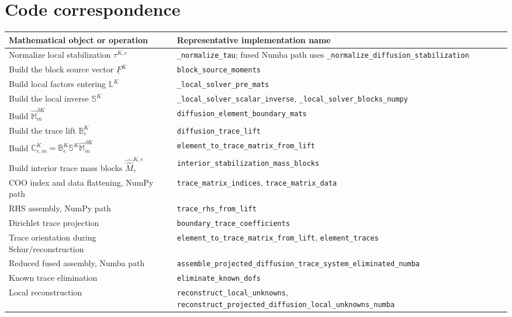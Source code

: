 \documentclass[11pt]{article}
\newcommand{\FK}{\underline F^K}
\newcommand{\LK}{\mathbb L^K}
\newcommand{\SK}{\mathbb S^K}
\newcommand{\B}{\mathbb B}
\newcommand{\C}{\mathbb C}
\newcommand{\Mbb}{\widehat{\mathbb M}}
\newcommand{\Mhh}{\widehat{\widehat M}}
\newcommand{\code}[1]{\texttt{#1}}
\begin{document}
\section{Code correspondence}

\begin{center}
\renewcommand{\arraystretch}{1.2}
\begin{tabular}{>{\raggedright\arraybackslash}p{} >{\raggedright\arraybackslash}p{}}
\toprule
Mathematical object or operation & Representative implementation name \\
\midrule
Normalize local stabilization $\tau^{K,e}$ & \code{\_normalize\_tau}; fused Numba path uses \code{\_normalize\_diffusion\_stabilization} \\
Build the block source vector $\FK$ & \code{block\_source\_moments} \\
Build local factors entering $\LK$ & \code{\_local\_solver\_pre\_mats} \\
Build the local inverse $\SK$ & \code{\_local\_solver\_scalar\_inverse}, \code{\_local\_solver\_blocks\_numpy} \\
Build $\Mbb_m^{\partial K}$ & \code{diffusion\_element\_boundary\_mats} \\
Build the trace lift $\B_e^K$ & \code{diffusion\_trace\_lift} \\
Build $\C_{e,m}^K=\B_e^K\SK\Mbb_m^{\partial K}$ & \code{element\_to\_trace\_matrix\_from\_lift} \\
Build interior trace mass blocks $\Mhh_\tau^{K,e}$ & \code{interior\_stabilization\_mass\_blocks} \\
COO index and data flattening, NumPy path & \code{trace\_matrix\_indices}, \code{trace\_matrix\_data} \\
RHS assembly, NumPy path & \code{trace\_rhs\_from\_lift} \\
Dirichlet trace projection & \code{boundary\_trace\_coefficients} \\
Trace orientation during Schur/reconstruction & \code{element\_to\_trace\_matrix\_from\_lift}, \code{element\_traces} \\
Reduced fused assembly, Numba path & \code{assemble\_projected\_diffusion\_trace\_system\_eliminated\_numba} \\
Known trace elimination & \code{eliminate\_known\_dofs} \\
Local reconstruction & \code{reconstruct\_local\_unknowns}, \code{reconstruct\_projected\_diffusion\_local\_unknowns\_numba} \\
\bottomrule
\end{tabular}
\end{center}
\end{document}
